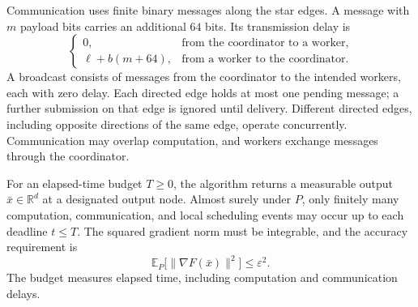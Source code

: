 \documentclass[10pt]{article}
\theoremstyle{definition}
\begin{document}
Communication uses finite binary messages along the star edges. A message with $m$ payload bits carries an additional $64$ bits. Its transmission delay is
\[
\begin{cases}
0, & \text{from the coordinator to a worker},\\
\ell+b(m+64), & \text{from a worker to the coordinator}.
\end{cases}
\]
A broadcast consists of messages from the coordinator to the intended workers, each with zero delay. Each directed edge holds at most one pending message; a further submission on that edge is ignored until delivery. Different directed edges, including opposite directions of the same edge, operate concurrently. Communication may overlap computation, and workers exchange messages through the coordinator.

For an elapsed-time budget $T\geq0$, the algorithm returns a measurable output $\bar{x}\in\mathbb{R}^d$ at a designated output node. Almost surely under $P$, only finitely many computation, communication, and local scheduling events may occur up to each deadline $t\leq T$. The squared gradient norm must be integrable, and the accuracy requirement is
\[
\mathbb{E}_{P}\bigl[\|\nabla F(\bar{x})\|^2\bigr]
\leq\varepsilon^2.
\]
The budget measures elapsed time, including computation and communication delays.
\end{document}
